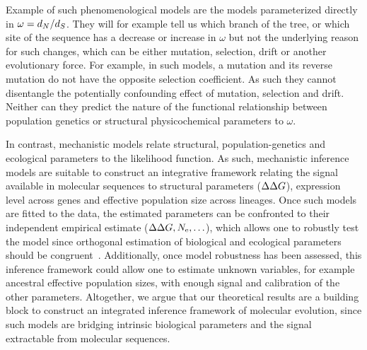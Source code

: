 Example of such phenomenological models are the models parameterized directly in $\omega = d_N / d_S$.
They will for example tell us which branch of the tree, or which site of the sequence has a decrease or increase in $\omega$ but not the underlying reason for such changes, which can be either mutation, selection, drift or another evolutionary force.
For example, in such models, a mutation and its reverse mutation do not have the opposite selection coefficient.
As such they cannot disentangle the potentially confounding effect of mutation, selection and drift.
Neither can they predict the nature of the functional relationship between population genetics or structural physicochemical parameters to $\omega$.

In contrast, mechanistic models relate structural, population-genetics and ecological parameters to the likelihood function.
As such, mechanistic inference models are suitable to construct an integrative framework relating the signal available in molecular sequences to structural parameters ($\Delta \Delta G$), expression level across genes and effective population size across lineages.
Once such models are fitted to the data, the estimated parameters can be confronted to their independent empirical estimate ($\Delta \Delta G, N_{\text{e}}, \hdots$), which allows one to robustly test the model since orthogonal estimation of biological and ecological parameters should be congruent~\citep{Dasmeh2014}.
Additionally, once model robustness has been assessed, this inference framework could allow one to estimate unknown variables, for example ancestral effective population sizes, with enough signal and calibration of the other parameters.
Altogether, we argue that our theoretical results are a building block to construct an integrated inference framework of molecular evolution, since such models are bridging intrinsic biological parameters and the signal extractable from molecular sequences.



